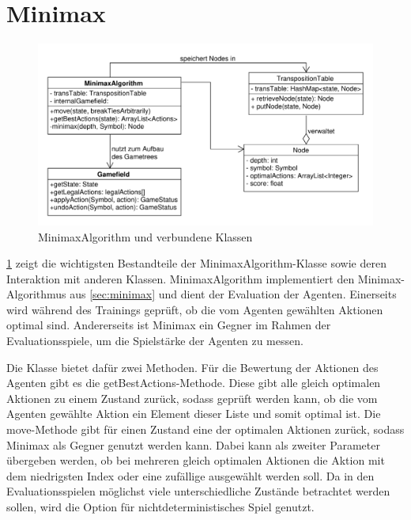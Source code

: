 \section{Minimax}
\begin{figure}
    \centering
    \includegraphics[width=\textwidth]{04_Artefakte/01_Abbildungen/uml/uml_minimax.pdf}
    \caption{MinimaxAlgorithm und verbundene Klassen}
    \label{fig:uml_minimax}
\end{figure}

\cref{fig:uml_minimax} zeigt die wichtigsten Bestandteile der MinimaxAlgorithm-Klasse sowie deren Interaktion mit anderen Klassen.
MinimaxAlgorithm implementiert den Minimax-Algorithmus aus \cref{sec:minimax} und dient der Evaluation der Agenten. 
Einerseits wird während des Trainings geprüft, ob die vom Agenten gewählten Aktionen optimal sind. 
Andererseits ist Minimax ein Gegner im Rahmen der Evaluationsspiele, um die Spielstärke der Agenten zu messen. 

Die Klasse bietet dafür zwei Methoden. 
Für die Bewertung der Aktionen des Agenten gibt es die getBestActions-Methode. 
Diese gibt alle gleich optimalen Aktionen zu einem Zustand zurück, sodass geprüft werden kann, ob die vom Agenten gewählte Aktion ein Element dieser Liste und somit optimal ist. 
Die move-Methode gibt für einen Zustand eine der optimalen Aktionen zurück, sodass Minimax als Gegner genutzt werden kann. 
Dabei kann als zweiter Parameter übergeben werden, ob bei mehreren gleich optimalen Aktionen die Aktion mit dem niedrigsten Index oder eine zufällige ausgewählt werden soll. 
Da in den Evaluationsspielen möglichst viele unterschiedliche Zustände betrachtet werden sollen, wird die Option für nichtdeterministisches Spiel genutzt.


